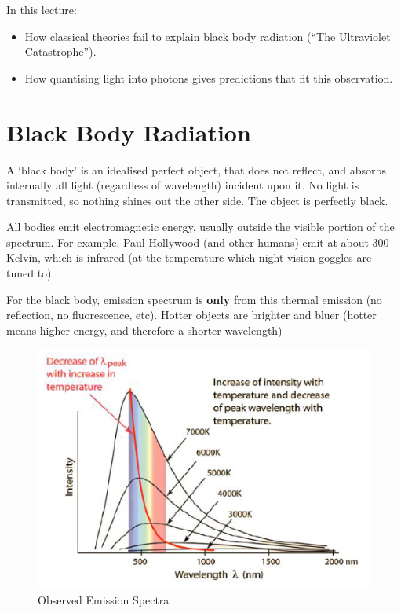 
In this lecture:
\begin{itemize}
    \item How classical theories fail to explain black body radiation (``The Ultraviolet Catastrophe'').
    \item How quantising light into photons gives predictions that fit this observation.
\end{itemize}

\section*{Black Body Radiation}
A `black body' is an idealised perfect object, that does not reflect, and absorbs internally all light (regardless of wavelength) incident upon it. No light is transmitted, so nothing shines out the other side. The object is perfectly black.

All bodies emit electromagnetic energy, usually outside the visible portion of the spectrum. For example, Paul Hollywood (and other humans) emit at about 300 Kelvin, which is infrared (at the temperature which night vision goggles are tuned to).

For the black body, emission spectrum is \textbf{only} from this thermal emission (no reflection, no fluorescence, etc). Hotter objects are brighter and bluer (hotter means higher energy, and therefore a shorter wavelength)

\begin{figure}[H]
    \centering
    \includegraphics{figures/lec02-01.png}
     \caption{Observed Emission Spectra}
\end{figure}

